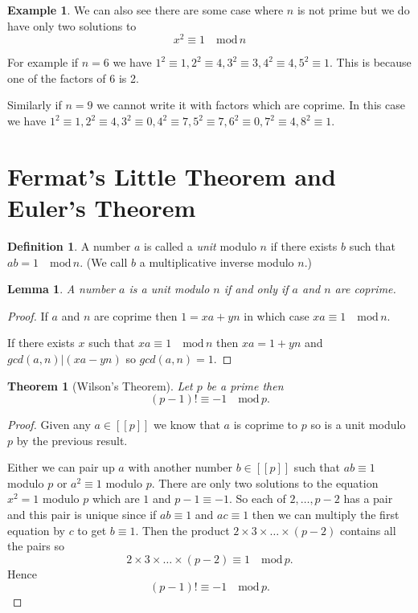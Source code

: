 \documentclass[
]{book}
\newtheorem{theorem}{Theorem}[chapter]
\newtheorem{lemma}{Lemma}[chapter]
\theoremstyle{definition}
\newtheorem{definition}{Definition}[chapter]
\theoremstyle{definition}
\newtheorem{example}{Example}[chapter]
\theoremstyle{definition}
\theoremstyle{definition}
\theoremstyle{remark}
\begin{document}
\begin{example}
We can also see there are some case where \(n\) is not prime but we do have only two solutions to
\[ x^2 \equiv 1 \quad \mbox{mod}\, n\]

For example if \(n=6\) we have \(1^2 \equiv 1, 2^2 \equiv 4, 3^2 \equiv 3, 4^2 \equiv 4, 5^2 \equiv 1\). This is because one of the factors of \(6\) is 2.

Similarly if \(n=9\) we cannot write it with factors which are coprime. In this case we have \(1^2 \equiv 1, 2^2 \equiv 4, 3^2 \equiv 0, 4^2 \equiv 7, 5^2 \equiv 7, 6^2 \equiv 0, 7^2 \equiv 4, 8^2 \equiv 1\).
\end{example}

\section{Fermat's Little Theorem and Euler's Theorem}\label{fermats-little-theorem-and-eulers-theorem}

\begin{definition}
A number \(a\) is called a \emph{unit} modulo \(n\) if there exists \(b\) such that \(ab = 1 \quad \mbox{mod} \, n\). (We call \(b\) a multiplicative inverse modulo \(n\).)
\end{definition}

\begin{lemma}
A number \(a\) is a unit modulo \(n\) if and only if \(a\) and \(n\) are coprime.
\end{lemma}

\begin{proof}
If \(a\) and \(n\) are coprime then \(1 = xa + yn\) in which case \(xa\equiv 1 \quad \mbox{mod} \, n\).

If there exists \(x\) such that \(xa \equiv 1 \quad \mbox{mod} \, n\) then \(x a = 1 + y n\) and \(gcd(a,n) | (xa-yn)\) so \(gcd(a,n) = 1\).
\end{proof}

\begin{theorem}[Wilson's Theorem]
Let \(p\) be a prime then
\[ (p-1)! \equiv -1 \quad \mbox{mod} \, p.\]
\end{theorem}

\begin{proof}
Given any \(a \in [[p]]\) we know that \(a\) is coprime to \(p\) so is a unit modulo \(p\) by the previous result.

Either we can pair up \(a\) with another number \(b \in [[p]]\) such that \(ab \equiv 1\) modulo \(p\) or \(a^2 \equiv 1\) modulo \(p\). There are only two solutions to the equation \(x^2 =1\) modulo \(p\) which are \(1\) and \(p-1 \equiv -1\). So each of \(2, \dots, p-2\) has a pair and this pair is unique since if \(ab \equiv 1\) and \(ac \equiv 1\) then we can multiply the first equation by \(c\) to get \(b \equiv 1\). Then the product \(2 \times 3 \times \dots \times (p-2)\) contains all the pairs so
\[ 2 \times 3 \times \dots \times (p-2) \equiv 1 \quad \mbox{mod} \, p.  \]
Hence
\[(p-1)! \equiv -1 \quad \mbox{mod} \, p.  \]
\end{proof}
\end{document}
